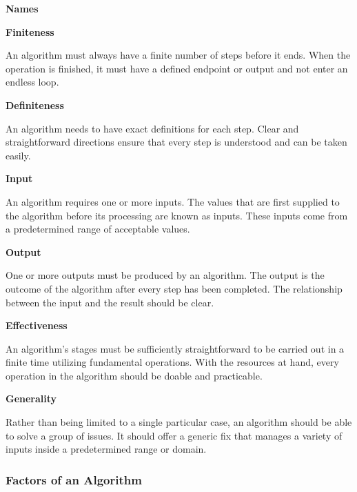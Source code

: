 \documentclass[
  letterpaper,
  DIV=11,
  numbers=noendperiod]{scrreprt}
\begin{document}
\begin{tcolorbox}[enhanced jigsaw, colframe=quarto-callout-note-color-frame, toprule=.15mm, bottomrule=.15mm, rightrule=.15mm, colback=white, breakable, arc=.35mm, opacityback=0, left=2mm, leftrule=.75mm]

\vspace{-3mm}\textbf{Names}\vspace{3mm}

\textbf{Finiteness}

An algorithm must always have a finite number of steps before it ends.
When the operation is finished, it must have a defined endpoint or
output and not enter an endless loop.

\textbf{Definiteness}

An algorithm needs to have exact definitions for each step. Clear and
straightforward directions ensure that every step is understood and can
be taken easily.

\textbf{Input}

An algorithm requires one or more inputs. The values that are first
supplied to the algorithm before its processing are known as inputs.
These inputs come from a predetermined range of acceptable values.

\textbf{Output}

One or more outputs must be produced by an algorithm. The output is the
outcome of the algorithm after every step has been completed. The
relationship between the input and the result should be clear.

\textbf{Effectiveness}

An algorithm's stages must be sufficiently straightforward to be carried
out in a finite time utilizing fundamental operations. With the
resources at hand, every operation in the algorithm should be doable and
practicable.

\textbf{Generality}

Rather than being limited to a single particular case, an algorithm
should be able to solve a group of issues. It should offer a generic fix
that manages a variety of inputs inside a predetermined range or domain.

\end{tcolorbox}

\subsubsection*{Factors of an Algorithm}\label{factors-of-an-algorithm}
\end{document}
